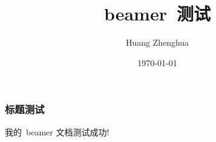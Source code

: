 \documentclass[red]{beamer}
\begin{document}
\begin{CJK*}{GBK}{kai}
\title{beamer~测试}
\author{Huang Zhenghua}
\date{\today}
\frame{\titlepage}
\begin{frame}\frametitle{标题测试}
我的~beamer 文档测试成功!
\end{frame}
\end{CJK*}
\end{document}

